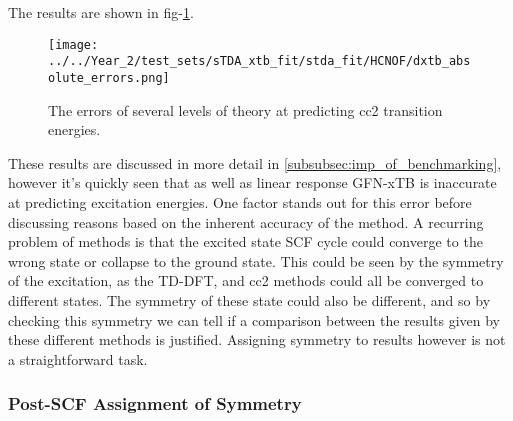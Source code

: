 The results are shown in fig-\ref{fig:dxtb_absolute_errors}.

\begin{figure}
    \label{fig:dxtb_absolute_errors}
    \texttt{[image: ../../Year\_2/test\_sets/sTDA\_xtb\_fit/stda\_fit/HCNOF/dxtb\_absolute\_errors.png]}
    \caption{The errors of several levels of theory at predicting cc2 transition
    energies.}
\end{figure}

These results are discussed in more detail in \ref{subsubsec:imp_of_benchmarking},
however it's quickly seen that \dxtb as well as linear response GFN-xTB is inaccurate 
at predicting excitation energies.
One factor stands out for this error before discussing reasons based on
the inherent accuracy of the method. A recurring problem of \dscf methods is that
the excited state SCF cycle could converge to the wrong state or collapse to the
ground state. This could be seen by the symmetry of the excitation, as the TD-DFT,
\dscf and cc2 methods could all be converged to different states. The symmetry of
these state could also be different, and so by checking this symmetry we can tell
if a comparison between the results given by these different methods is justified.
Assigning symmetry to \dscf results however is not a straightforward task.

\subsubsection{Post-SCF Assignment of Symmetry}
\label{subsubsec:post_scf_symmetry}

